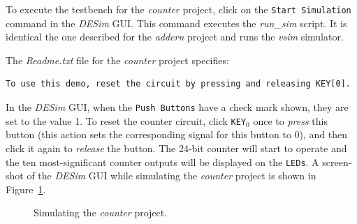 To execute the testbench for the {\it counter} project, click on the
\texttt{Start Simulation} command in the {\it DESim} GUI. This command executes the
{\it run\_sim} script. It is identical the one described for the 
{\it addern} project and runs the {\it vsim} simulator.

The {\it Readme.txt} file for the {\it counter} project specifies:

\lstset{language=make,numbers=none,escapechar=|}
\begin{lstlisting}[]
To use this demo, reset the circuit by pressing and releasing KEY[0].
\end{lstlisting}

In the {\it DESim} GUI, when the \texttt{Push Buttons} have a check mark shown, they are set to the
value 1. To reset the counter circuit, click \texttt{KEY}$_0$ once to {\it press} this button
(this action sets the corresponding signal for this button to 0), and then click it again
to {\it release} the button. The 24-bit counter will start to operate and the ten
most-significant counter outputs will be displayed on the \texttt{LEDs}. A screen-shot of
the {\it DESim} GUI while simulating the {\it counter} project is shown in 
Figure~\ref{fig:sim2}.

\begin{figure}[h]
	\begin{center}
        \setlength{\fboxsep}{0pt}
	\end{center}
          \caption{Simulating the {\it counter} project.}
	\label{fig:sim2}
\end{figure}

